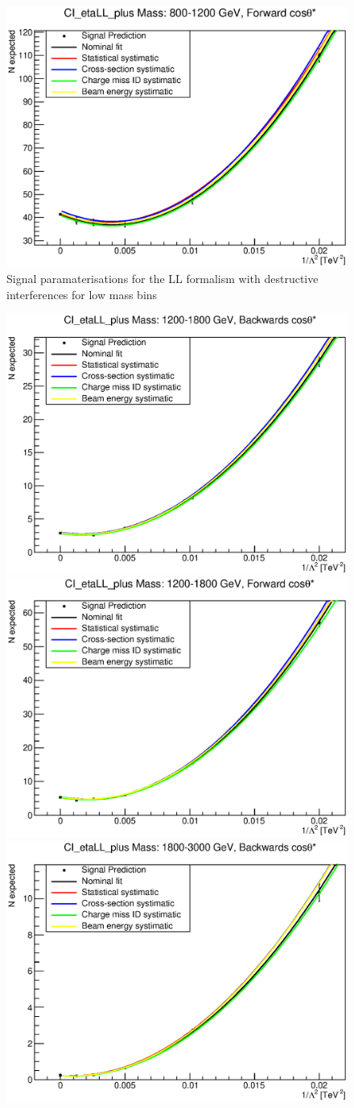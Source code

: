 \begin{figure}[ht]
			\includegraphics[width=0.49\linewidth]{images/thesis_fits/CI_2D_etaLL_plus_Mass_800-1200_GeV_CTS_0_1.eps}
		\caption{Signal paramaterisations for the LL formalism with destructive interferences for low mass bins}
		\label{fig:parm_LL_p_1}
	\end{figure}

	\begin{figure}[ht]
		\centering
			\includegraphics[width=0.49\linewidth]{images/thesis_fits/CI_2D_etaLL_plus_Mass_1200-1800_GeV_CTS_-1_0.eps}
			\includegraphics[width=0.49\linewidth]{images/thesis_fits/CI_2D_etaLL_plus_Mass_1200-1800_GeV_CTS_0_1.eps}
			\includegraphics[width=0.49\linewidth]{images/thesis_fits/CI_2D_etaLL_plus_Mass_1800-3000_GeV_CTS_-1_0.eps}

\end{figure}
